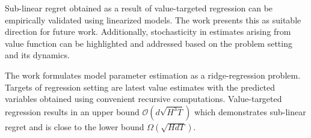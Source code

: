 \documentclass[12pt,letterpaper]{article}
\begin{document}
Sub-linear regret obtained as a result of value-targeted regression can be empirically validated using linearized models. The work presents this as suitable direction for future work. Additionally, stochasticity in estimates arising from value function can be highlighted and addressed based on the problem setting and its dynamics. 

The work formulates model parameter estimation as a ridge-regression problem. Targets of regression setting are latest value estimates with the predicted variables obtained using convenient recursive computations. Value-targeted regression results in an upper bound $\mathcal{O}(d\sqrt{H^{3}T})$ which demonstrates sub-linear regret and is close to the lower bound $\Omega(\sqrt{HdT})$. 
\end{document}
